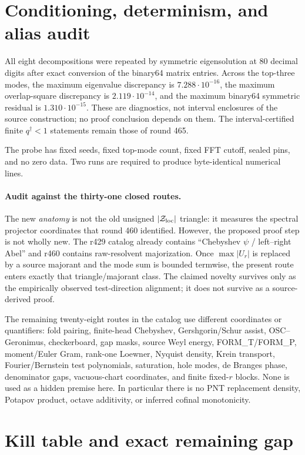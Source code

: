 \documentclass[11pt]{article}
\theoremstyle{remark}
\newcommand{\qdag}{q^{\dagger}}
\begin{document}
\section{Conditioning, determinism, and alias audit}

All eight decompositions were repeated by symmetric eigensolution at
80 decimal digits after exact conversion of the binary64 matrix entries.
Across the top-three modes, the maximum eigenvalue discrepancy is
$7.288\cdot10^{-16}$, the maximum overlap-square discrepancy is
$2.119\cdot10^{-14}$, and the maximum binary64 symmetric residual is
$1.310\cdot10^{-15}$.  These are diagnostics, not interval enclosures
of the source construction; no proof conclusion depends on them.
The interval-certified finite $\qdag<1$ statements remain those of
round 465.

The probe has fixed seeds, fixed top-mode count, fixed FFT cutoff, sealed
pins, and no zero data.  Two runs are required to produce byte-identical
numerical lines.

\paragraph{Audit against the thirty-one closed routes.}
The new \emph{anatomy} is not the old unsigned $|\mathcal Z_{\rm loc}|$
triangle: it measures the spectral projector coordinates that round 460
identified.  However, the proposed proof step is not wholly new.
The r429 catalog already contains ``Chebyshev $\psi$ / left--right Abel''
and r460 contains raw-resolvent majorization.  Once
$\max|U_r|$ is replaced by a source majorant and the mode sum is bounded
termwise, the present route enters exactly that triangle/majorant class.
The claimed novelty survives only as the empirically observed
test-direction alignment; it does not survive as a source-derived proof.

The remaining twenty-eight routes in the catalog use different
coordinates or quantifiers: fold pairing, finite-head Chebyshev,
Gershgorin/Schur assist, OSC--Geronimus, checkerboard, gap masks,
source Weyl energy, FORM\_T/FORM\_P, moment/Euler Gram, rank-one
Loewner, Nyquist density, Krein transport, Fourier/Bernstein test
polynomials, saturation, hole modes, de Branges phase, denominator gaps,
vacuous-chart coordinates, and finite fixed-$r$ blocks.  None is used as
a hidden premise here.  In particular there is no PNT replacement
density, Potapov product, octave additivity, or inferred cofinal
monotonicity.

\section{Kill table and exact remaining gap}
\end{document}
